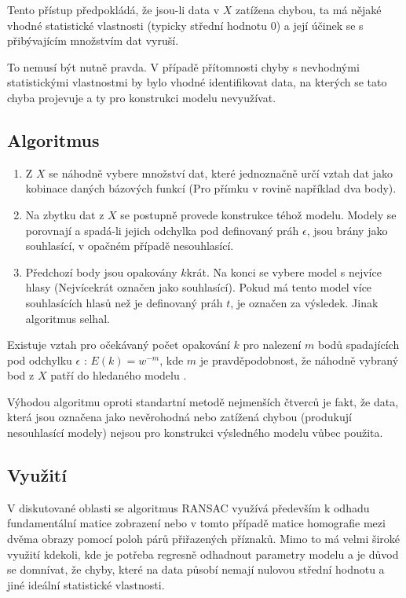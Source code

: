 	Tento přístup předpokládá, že jsou-li data v $X$ zatížena chybou, ta má nějaké vhodné statistické vlastnosti (typicky střední hodnotu 0) a její účinek se s přibývajícím množstvím dat vyruší.
	
	To nemusí být nutně pravda. V případě přítomnosti chyby s nevhodnými statistickými vlastnostmi by bylo vhodné identifikovat data, na kterých se tato chyba projevuje a ty pro konstrukci modelu nevyužívat.
	
	\subsection{Algoritmus}
		
	\begin{enumerate}
		\item Z $X$  se náhodně vybere množství dat, které jednoznačně určí vztah dat jako kobinace daných bázových funkcí (Pro přímku v rovině například dva body).
		\item Na zbytku dat z $X$ se postupně provede konstrukce téhož modelu. Modely se porovnají a spadá-li jejich odchylka pod definovaný práh $\epsilon$, jsou brány jako souhlasící, v opačném případě nesouhlasící.
		\item Předchozí body jsou opakovány $k$krát. Na konci se vybere model s nejvíce hlasy (Nejvícekrát označen jako souhlasící). Pokud má tento model více souhlasících hlasů než je definovaný práh $t$, je označen za výsledek. Jinak algoritmus selhal.
	\end{enumerate}
	
		Existuje vztah pro očekávaný počet opakování $k$ pro nalezení $m$ bodů spadajících pod odchylku $\epsilon$ :
		$E(k) = w^{-m}$, kde $m$ je pravděpodobnost, že náhodně vybraný bod z $X$ patří do hledaného modelu \cite{fischler1981random} .
	
		Výhodou algoritmu oproti standartní metodě nejmenších čtverců je fakt, že data, která jsou označena jako nevěrohodná nebo zatížená chybou (produkují nesouhlasící modely) nejsou pro konstrukci výsledného modelu vůbec použita.
		
	\subsection{Využití}
		V diskutované oblasti se algoritmus RANSAC využívá především k odhadu fundamentální matice zobrazení nebo v tomto případě matice homografie mezi dvěma obrazy pomocí poloh párů přiřazených příznaků. Mimo to má velmi široké využití kdekoli, kde je potřeba regresně odhadnout parametry modelu a je důvod se domnívat, že chyby, které na data působí nemají nulovou střední hodnotu a jiné ideální statistické vlastnosti.
	